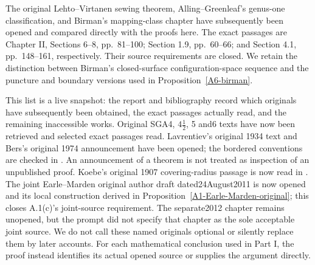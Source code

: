 The original Lehto--Virtanen sewing theorem, Alling--Greenleaf's
genus-one classification, and Birman's mapping-class chapter have
subsequently been opened and compared directly with the proofs here.
The exact passages are Chapter II, Sections 6--8, pp.~81--100;
Section 1.9, pp.~60--66; and Section 4.1, pp.~148--161, respectively.
Their source requirements are closed. We retain the distinction between
Birman's closed-surface configuration-space sequence and the puncture
and boundary versions used in Proposition~\ref{A6-birman}.

This list is a live snapshot: the report and bibliography record which
originals have subsequently been obtained, the exact passages actually
read, and the remaining inaccessible works. Original SGA4, $4\frac12$,
5 and6 texts have now been retrieved and selected exact passages read.
Lavrentiev's original 1934 text and Bers's original 1974 announcement
have been opened; the bordered conventions are checked in
\cite[\S\S2(F),3(F),4(E)]{ABers1981}. An announcement of a theorem is
not treated as inspection of an unpublished proof. Koebe's original
1907 covering-radius passage is now read in
\cite[pp.~203--205]{AKoebe1907}. The joint Earle--Marden original
author draft dated24August2011 is now opened and its local construction
derived in Proposition~\ref{A1-Earle-Marden-original}; this closes
A.1(c)'s joint-source requirement. The separate2012 chapter remains
unopened, but the prompt did not specify that chapter as the sole
acceptable joint source. We do not call these
named originals optional or silently replace
them by later accounts. For each mathematical conclusion used in Part I,
the proof instead identifies its actual opened source or supplies the
argument directly.
